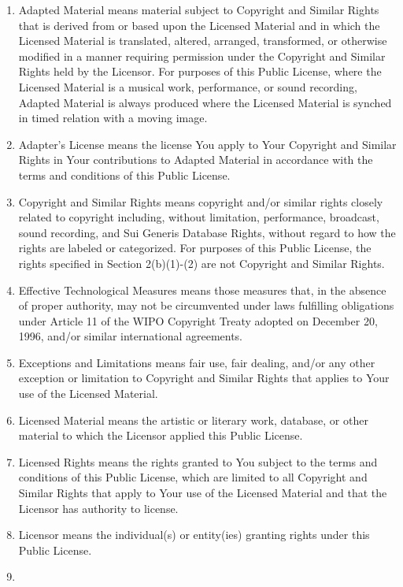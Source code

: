 \documentclass[]{article}
\begin{document}
\begin{enumerate}
\def\labelenumi{\alph{enumi}.}
\item
  Adapted Material means material subject to Copyright and Similar
  Rights that is derived from or based upon the Licensed Material and in
  which the Licensed Material is translated, altered, arranged,
  transformed, or otherwise modified in a manner requiring permission
  under the Copyright and Similar Rights held by the Licensor. For
  purposes of this Public License, where the Licensed Material is a
  musical work, performance, or sound recording, Adapted Material is
  always produced where the Licensed Material is synched in timed
  relation with a moving image.
\item
  Adapter's License means the license You apply to Your Copyright and
  Similar Rights in Your contributions to Adapted Material in accordance
  with the terms and conditions of this Public License.
\item
  Copyright and Similar Rights means copyright and/or similar rights
  closely related to copyright including, without limitation,
  performance, broadcast, sound recording, and Sui Generis Database
  Rights, without regard to how the rights are labeled or categorized.
  For purposes of this Public License, the rights specified in Section
  2(b)(1)-(2) are not Copyright and Similar Rights.
\item
  Effective Technological Measures means those measures that, in the
  absence of proper authority, may not be circumvented under laws
  fulfilling obligations under Article 11 of the WIPO Copyright Treaty
  adopted on December 20, 1996, and/or similar international agreements.
\item
  Exceptions and Limitations means fair use, fair dealing, and/or any
  other exception or limitation to Copyright and Similar Rights that
  applies to Your use of the Licensed Material.
\item
  Licensed Material means the artistic or literary work, database, or
  other material to which the Licensor applied this Public License.
\item
  Licensed Rights means the rights granted to You subject to the terms
  and conditions of this Public License, which are limited to all
  Copyright and Similar Rights that apply to Your use of the Licensed
  Material and that the Licensor has authority to license.
\item
  Licensor means the individual(s) or entity(ies) granting rights under
  this Public License.
\item

\end{enumerate}
\end{document}
